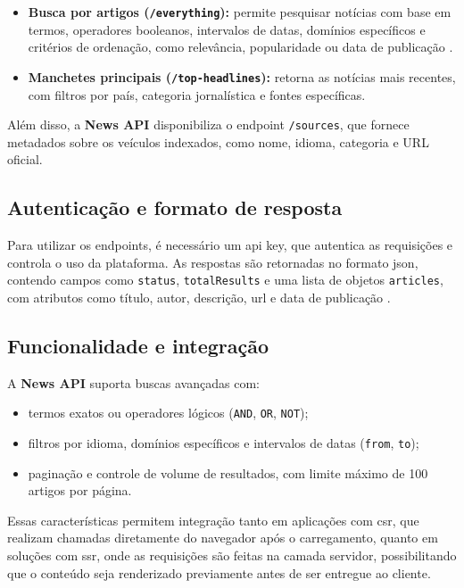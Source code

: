 \begin{itemize}
    \item \textbf{Busca por artigos (\texttt{/everything}):} permite pesquisar notícias com base em termos, operadores booleanos, intervalos de datas, domínios específicos e critérios de ordenação, como relevância, popularidade ou data de publicação \cite{newsapi_docs}.
    \item \textbf{Manchetes principais (\texttt{/top-headlines}):} retorna as notícias mais recentes, com filtros por país, categoria jornalística e fontes específicas.
\end{itemize}

Além disso, a \textbf{News API} disponibiliza o endpoint \texttt{/sources}, que fornece metadados sobre os veículos indexados, como nome, idioma, categoria e URL oficial.

\subsection{Autenticação e formato de resposta}
Para utilizar os endpoints, é necessário um \acrshort{api} key, que autentica as requisições e controla o uso da plataforma. As respostas são retornadas no formato \acrshort{json}, contendo campos como \texttt{status}, \texttt{totalResults} e uma lista de objetos \texttt{articles}, com atributos como título, autor, descrição, \acrshort{url} e data de publicação \cite{newsapi_docs}.

\subsection{Funcionalidade e integração}
A \textbf{News API} suporta buscas avançadas com:

\begin{itemize}
    \item termos exatos ou operadores lógicos (\texttt{AND}, \texttt{OR}, \texttt{NOT});
    \item filtros por idioma, domínios específicos e intervalos de datas (\texttt{from}, \texttt{to});
    \item paginação e controle de volume de resultados, com limite máximo de 100 artigos por página.
\end{itemize}

Essas características permitem integração tanto em aplicações com \acrshort{csr}, que realizam chamadas diretamente do navegador após o carregamento, quanto em soluções com \acrshort{ssr}, onde as requisições são feitas na camada servidor, possibilitando que o conteúdo seja renderizado previamente antes de ser entregue ao cliente.






